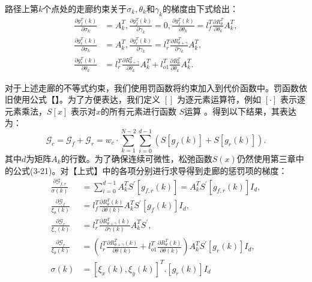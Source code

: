 \documentclass[master,academic]{ysuthesis} %
\begin{document}
		路径上第$k$个点处的走廊约束关于$\sigma_k,\theta_k$和$\gamma_k$的梯度由下式给出：
		\begin{equation}
			\begin{aligned}
			\frac{\partial g_{f}^{T}(k)}{\partial \sigma _k}&=A_{k}^{T},\frac{\partial g_{f}^{T}(k)}{\partial \gamma _k}=0,\frac{\partial g_{f}^{T}(k)}{\partial \theta _k}=l_{f}^{T}\frac{\partial R_{\theta}^{T}}{\partial \theta _k}A_{k}^{T},\\
			\frac{\partial g_{r}^{T}(k)}{\partial \sigma _k}&=A_{k}^{T},\frac{\partial g_{r}^{T}(k)}{\partial \gamma _k}=l_{r}^{T}\frac{\partial R_{\theta +\gamma}^{T}}{\partial \gamma _k}A_{k}^{T},\\
			\frac{\partial g_{r}^{T}(k)}{\partial \theta _k}&=l_{r}^{T}\frac{\partial R_{\theta +\gamma}^{T}}{\partial \theta _k}A_{k}^{T}+l_{o1}^{T}\frac{\partial R_{\theta}^{T}}{\partial \theta _k}A_{k}^{T}.
			\end{aligned}
		\end{equation}

		对于上述走廊的不等式约束，我们使用罚函数将约束加入到代价函数中。罚函数依旧使用公式【】。为了方便表达，我们定义 \([]\) 为逐元素运算符，例如 \([\cdot]\) 表示逐元素乘法，\(S[x]\) 表示对$x$的所有元素进行函数 \(S\)运算 。得到以下结果，其表达为：
		\begin{equation}
			\mathcal{G}_c =\mathcal{G}_{f}+\mathcal{G}_{r}=w_{c}\cdot \sum_{k=1}^{N-2}\sum_{i=0}^{d-1}(S[g_f(k)] + S[g_r(k)]).\label{20}
		\end{equation}
		其中$d$为矩阵$A_k$的行数。为了确保连续可微性，松弛函数$S(x)$仍然使用第三章中的公式(3-21)。对【上式】中的各项分别进行求导得到走廊的惩罚项的梯度：
		\begin{equation}
			\begin{aligned}
				\frac{\partial \mathcal{G}_{f,r}}{\sigma \left( k \right)}&=\sum_{i=0}^{d-1}{A}_{k}^{T}S^{'}\left[ g_{f,r}\left( k \right) \right] =A_{k}^{T}S^{'}\left[ g_{f,r}\left( k \right) \right] I_d,\\
				\frac{\partial \mathcal{G}_f}{\xi _{\theta}\left( k \right)}&=l_{f}^{T}\frac{\partial R_{\theta}^{T}\left( k \right)}{\partial \theta \left( k \right)}A_{k}^{T}S^{'}\left[ g_f\left( k \right) \right] I_d,\\
				\frac{\partial \mathcal{G}_r}{\xi _{\gamma}\left( k \right)}&=l_{r}^{T}\frac{\partial R_{\theta +\gamma}^{T}\left( k \right)}{\partial \gamma \left( k \right)}A_{k}^{T}S^{'},\\
				\frac{\partial \mathcal{G}_r}{\xi _{\theta}\left( k \right)}&=\left( l_{r}^{T}\frac{\partial R_{\theta +\gamma}^{T}\left( k \right)}{\partial \theta \left( k \right)}+l_{o1}^{T}\frac{\partial R_{\theta}^{T}\left( k \right)}{\partial \theta \left( k \right)} \right) A_{k}^{T}S^{'}\left[ g_r\left( k \right) \right] I_d,\\
				\sigma \left( k \right) &=\left[ \xi _x\left( k \right) ,\xi _y\left( k \right) \right] ^T.\left[ g_r\left( k \right) \right] I_d
			\end{aligned}
		\end{equation}
		
\end{document}
